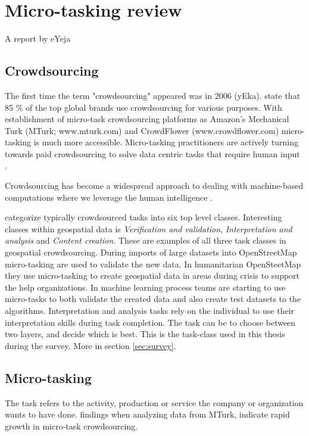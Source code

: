 \chapter{Micro-tasking review}

A report by eYeja 

\section{Crowdsourcing}

The first time the term "crowdsourcing" appeared was in 2006 (yEka). \cite{EYeka2015} state that 85 \% of the top global brands use crowdsourcing for various purposes. With establishment of micro-task crowdsourcing platforms as Amazon's Mechanical Turk (MTurk; www.mturk.com) and CrowdFlower (www.crowdflower.com) micro-tasking is much more accessible. Micro-tasking practitioners are actively turning towards paid crowdsourcing to solve data centric tasks that require human input \citep{Gadiraju2015}. 

Crowdsourcing has become a widespread approach to dealing with machine-based computations where we leverage the human intelligence \citep{Gadiraju2015}.

\cite{Gadiraju2015} categorize typically crowdsourced tasks into six top level classes. Interesting classes within geospatial data is \textit{Verification and validation}, \textit{Interpretation and analysis} and \textit{Content creation}. These are examples of all three task classes in geospatial crowdsourcing. During imports of large datasets into OpenStreetMap micro-tasking are used to validate the new data. In humanitarian OpenSteetMap they use micro-tasking to create geospatial data in areas during crisis to support the help organizations. In machine learning process teams are starting to use micro-tasks to both validate the created data and also create test datasets to the algorithms. Interpretation and analysis tasks rely on the individual to use their interpretation skills during task completion. The task can be to choose between two layers, and decide which is best. This is the task-class used in this thesis during the survey. More in section \ref{sec:survey}.

\section{Micro-tasking}

The task refers to the activity, production or service the company or organization wants to have done. \cite{Gadiraju2015} findings when analyzing data from MTurk, indicate rapid growth in micro-task crowdsourcing. 


